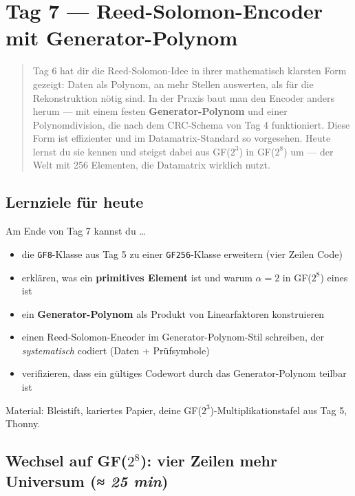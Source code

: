 \chapter{Tag 7 — Reed-Solomon-Encoder mit Generator-Polynom}

\begin{quote}
Tag 6 hat dir die Reed-Solomon-Idee in ihrer mathematisch klarsten
Form gezeigt: Daten als Polynom, an mehr Stellen auswerten, als für
die Rekonstruktion nötig sind. In der Praxis baut man den Encoder
anders herum — mit einem festen \textbf{Generator-Polynom} und einer
Polynomdivision, die nach dem CRC-Schema von Tag 4 funktioniert.
Diese Form ist effizienter und im Datamatrix-Standard so vorgesehen.
Heute lernst du sie kennen und steigst dabei aus GF($2^3$) in
GF($2^8$) um — der Welt mit 256 Elementen, die Datamatrix wirklich
nutzt.
\end{quote}

\section*{Lernziele für heute}

Am Ende von Tag 7 kannst du \dots

\begin{itemize}
\item die \texttt{GF8}-Klasse aus Tag 5 zu einer
  \texttt{GF256}-Klasse erweitern (vier Zeilen Code)
\item erklären, was ein \textbf{primitives Element} ist und warum
  $\alpha = 2$ in GF($2^8$) eines ist
\item ein \textbf{Generator-Polynom} als Produkt von Linearfaktoren
  konstruieren
\item einen Reed-Solomon-Encoder im Generator-Polynom-Stil schreiben,
  der \emph{systematisch} codiert (Daten + Prüfsymbole)
\item verifizieren, dass ein gültiges Codewort durch das
  Generator-Polynom teilbar ist
\end{itemize}

Material: Bleistift, kariertes Papier, deine GF($2^3$)-Multi\-pli\-ka\-tions\-tafel
aus Tag 5, Thonny.

\section{Wechsel auf GF($2^8$): vier Zeilen mehr Universum \normalfont(\textit{≈ 25 min})}

